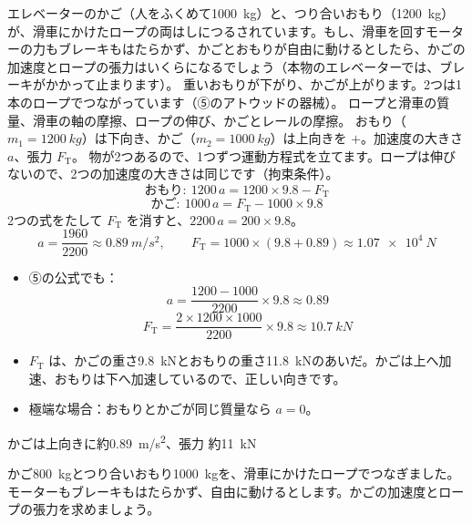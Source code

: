 \begin{phreidai}[エレベーターのつり合いおもり]
\label{ph:力-2:ex5}エレベーターのかご（人をふくめて\qty{1000}{kg}）と、つり合いおもり（\qty{1200}{kg}）が、滑車にかけたロープの両はしにつるされています。もし、滑車を回すモーターの力もブレーキもはたらかず、かごとおもりが自由に動けるとしたら、かごの加速度とロープの張力はいくらになるでしょう（本物のエレベーターでは、ブレーキがかかって止まります）。
\phbamen
重いおもりが下がり、かごが上がります。2つは1本のロープでつながっています（⑤のアトウッドの器械）。
\phmushi
ロープと滑車の質量、滑車の軸の摩擦、ロープの伸び、かごとレールの摩擦。
\phzu
おもり（$m_1=\qty{1200}{kg}$）は下向き、かご（$m_2=\qty{1000}{kg}$）は上向きを $+$。加速度の大きさ $a$、張力 $F_{\mathrm T}$。
\phriyu
物が2つあるので、1つずつ運動方程式を立てます。ロープは伸びないので、2つの加速度の大きさは同じです（拘束条件）。
\phtateru
\[ \text{おもり}:\ 1200\,a=1200\times9.8-F_{\mathrm T} \]
\[ \text{かご}:\ 1000\,a=F_{\mathrm T}-1000\times9.8 \]
\phtoku
2つの式をたして $F_{\mathrm T}$ を消すと、$2200\,a=200\times9.8$。
\[ a=\frac{1960}{2200}\approx\qty{0.89}{m/s^2},\qquad F_{\mathrm T}=1000\times(9.8+0.89)\approx\qty{1.07e4}{N} \]
\phtashikame
\begin{itemize}[leftmargin=1.2\zw, itemsep=1pt, topsep=1pt, label={\color{bkTheme}●}]
\item ⑤の公式でも：
\[ a=\frac{1200-1000}{2200}\times9.8\approx0.89 \]
\[ F_{\mathrm T}=\frac{2\times1200\times1000}{2200}\times9.8\approx\qty{10.7}{kN} \]
\item $F_{\mathrm T}$ は、かごの重さ\qty{9.8}{kN}とおもりの重さ\qty{11.8}{kN}のあいだ。かごは上へ加速、おもりは下へ加速しているので、正しい向きです。
\item 極端な場合：おもりとかごが同じ質量なら $a=0$。
\end{itemize}
\kotae かごは上向きに約\qty{0.89}{m/s^2}、張力 約\qty{11}{kN}
\end{phreidai}
\begin{jibun}
かご\qty{800}{kg}とつり合いおもり\qty{1000}{kg}を、滑車にかけたロープでつなぎました。モーターもブレーキもはたらかず、自由に動けるとします。かごの加速度とロープの張力を求めましょう。
\end{jibun}

